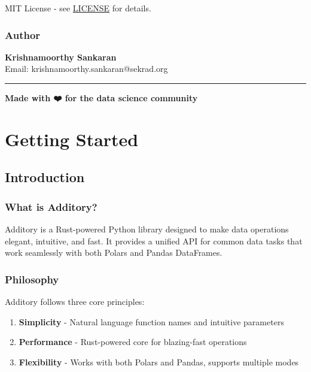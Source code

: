 \documentclass[
  letterpaper,
]{scrbook}
\providecommand{\tightlist}{%
  \setlength{\itemsep}{0pt}\setlength{\parskip}{0pt}}
\begin{document}
MIT License - see
\href{https://github.com/sekarkrishna/additory/blob/main/LICENSE}{LICENSE}
for details.

\section*{Author}\label{author}


\textbf{Krishnamoorthy Sankaran}\\
Email: krishnamoorthy.sankaran@sekrad.org

\begin{center}\rule{0.5\linewidth}{0.5pt}\end{center}

\textbf{Made with ❤️ for the data science community}

\part{Getting Started}

\chapter{Introduction}\label{introduction}

\section{What is Additory?}\label{what-is-additory}

Additory is a Rust-powered Python library designed to make data
operations elegant, intuitive, and fast. It provides a unified API for
common data tasks that work seamlessly with both Polars and Pandas
DataFrames.

\section{Philosophy}\label{philosophy}

Additory follows three core principles:

\begin{enumerate}
\def\labelenumi{\arabic{enumi}.}
\tightlist
\item
  \textbf{Simplicity} - Natural language function names and intuitive
  parameters
\item
  \textbf{Performance} - Rust-powered core for blazing-fast operations
\item
  \textbf{Flexibility} - Works with both Polars and Pandas, supports
  multiple modes
\end{enumerate}
\end{document}
